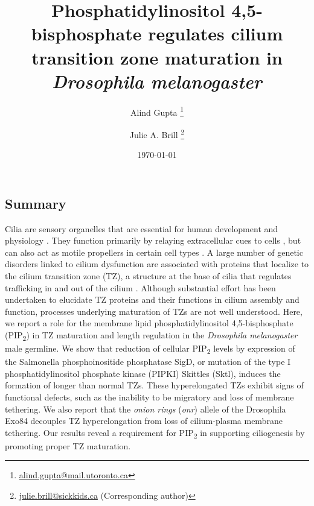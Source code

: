 \documentclass[12pt, twoside, letterpaper]{article}
\title{\vspace{-1cm} \bfseries\large Phosphatidylinositol 4,5-bisphosphate regulates cilium transition zone maturation in \textit{Drosophila melanogaster}}
\author[1,2]{Alind Gupta \thanks{\url{alind.gupta@mail.utoronto.ca}}}
\author[1,2]{Julie A. Brill \thanks{\url{julie.brill@sickkids.ca} (Corresponding author)}}
\affil[1]{\small Department of Molecular Genetics, University of Toronto, Toronto, ON M5S 1A8, Canada}
\affil[2]{\small Program in Cell Biology, Hospital for Sick Children, Toronto, ON M5G 1X8, Canada}
\date{\small \today}
\newcommand{\PIP}{PIP\textsubscript{2}}
\begin{document}
\maketitle

\begin{doublespacing}
  \begin{linenumbers}
    
    \section{Summary}
    Cilia are sensory organelles that are essential for human development
    and physiology \citep{satir2010primary, marshall2006cilia}.
    They function primarily by relaying extracellular cues to cells
    \citep{satir2010primary},
    but can also act as motile propellers in certain cell types
    \citep{bloodgood2010sensory}.
    A large number of genetic disorders linked to cilium dysfunction are
    associated with proteins that localize to the cilium transition zone (TZ),
    a structure at the base of cilia that regulates trafficking in and out
    of the cilium \citep{reiter2012base, szymanska2012transition}.
    Although substantial effort has been undertaken
    to elucidate TZ proteins and their functions in cilium assembly and function,
    processes underlying maturation of TZs are not well understood.
    Here, we report a role for the membrane lipid
    phosphatidylinositol 4,5-bisphosphate
    (\PIP{}) in TZ maturation and length regulation
    in the \textit{Drosophila melanogaster} male germline.
    We show that reduction of cellular \PIP{} levels
    by expression of the Salmonella phosphoinositide phosphatase SigD,
    or mutation of
    the type I phosphatidylinositol phosphate kinase (PIPKI) Skittles (Sktl),
    induces the formation of longer than normal TZs.
    These hyperelongated TZs exhibit signs of functional defects,
    such as the inability
    to be migratory \citep{basiri2014migrating} and loss of membrane tethering.
    We also report that the \textit{onion rings} (\textit{onr}) allele
    of the Drosophila Exo84
    decouples TZ hyperelongation from loss of cilium-plasma membrane tethering.
    Our results reveal a requirement for \PIP{} in supporting ciliogenesis
    by promoting proper TZ maturation.
    

\end{linenumbers}
\end{doublespacing}
\end{document}
